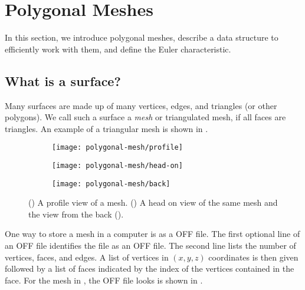 \section{Polygonal Meshes}
\label{sec:polygonal}

In this section, we introduce polygonal meshes, describe a data structure to efficiently
work with them, and define the Euler characteristic.

\subsection{What is a surface?}

 Many surfaces are made up of many vertices, edges, and
triangles (or other polygons). We call such a surface a \emph{mesh}
or triangulated mesh, if all faces are triangles.
An example of a triangular mesh is shown in .


 \begin{figure}[htb]
         \centering
        \begin{subfigure}[b]{0.3\textwidth}
         \texttt{[image: polygonal-mesh/profile]}
         \caption{}
 	 \label{fig:profile}
       \end{subfigure}
         \hspace{.6cm}
         \begin{subfigure}[b]{0.19\textwidth}
         \texttt{[image: polygonal-mesh/head-on]}
         \caption{}
          \label{fig:head-on}
         \end{subfigure}
             \hspace{.6cm}
         \begin{subfigure}[b]{0.24\textwidth}
         \texttt{[image: polygonal-mesh/back]}
         \caption{}
          \label{fig:back}
         \end{subfigure}
		\caption{() A profile view of a mesh.
 		()  A head on view of the same mesh and the view from the back ().
 		\label{fig:cat}}
 \end{figure}

One way to store a mesh in a computer is as a OFF file.
The first optional line of an OFF file identifies the file as an OFF file.
The second line lists the number of vertices, faces, and edges.
A list of vertices in $(x,y,z)$ coordinates is then given followed
by a list of faces indicated by the index of the vertices contained in the face.
For the mesh in , the OFF file looks is shown in 
.

